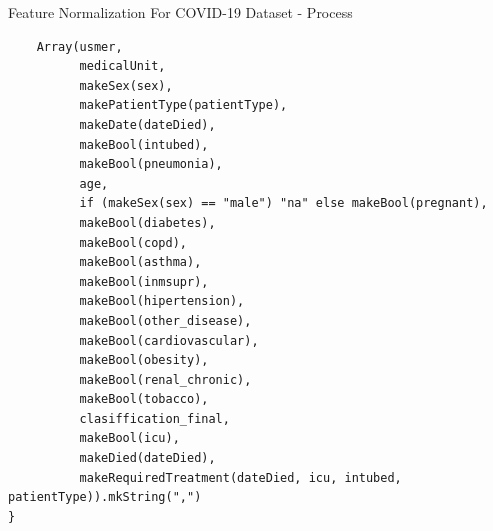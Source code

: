 \begin{listing}[H]
\caption{Feature Normalization For COVID-19 Dataset - Process}
\label{lst:feat_norm_process}
\begin{verbatim}
    Array(usmer, 
          medicalUnit, 
          makeSex(sex), 
          makePatientType(patientType), 
          makeDate(dateDied), 
          makeBool(intubed), 
          makeBool(pneumonia), 
          age, 
          if (makeSex(sex) == "male") "na" else makeBool(pregnant), 
          makeBool(diabetes), 
          makeBool(copd), 
          makeBool(asthma), 
          makeBool(inmsupr), 
          makeBool(hipertension), 
          makeBool(other_disease), 
          makeBool(cardiovascular), 
          makeBool(obesity), 
          makeBool(renal_chronic), 
          makeBool(tobacco), 
          clasiffication_final, 
          makeBool(icu),
          makeDied(dateDied),
          makeRequiredTreatment(dateDied, icu, intubed, patientType)).mkString(",")
}
\end{verbatim}
\end{listing}


